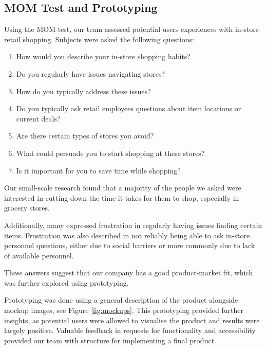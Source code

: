 \documentclass[titlepage]{article}
\begin{document}
\subsection{MOM Test and Prototyping}
Using the MOM test, our team assessed potential users experiences with in-store retail shopping. Subjects were asked the following questions:
\begin{enumerate}
    \item How would you describe your in-store shopping habits?
    \item Do you regularly have issues navigating stores?
    \item How do you typically address these issues?
    \item Do you typically ask retail employees questions about item locations or current deals?
    \item Are there certain types of stores you avoid?
    \item What could persuade you to start shopping at these stores?
    \item Is it important for you to save time while shopping?
\end{enumerate}
Our small-scale research found that a majority of the people we asked were interested in cutting down the time it takes for them to shop, especially in grocery stores. 

Additionally, many expressed frustration in regularly having issues finding certain items. Frustration was also described in not reliably being able to ask in-store personnel questions, either due to social barriers or more commonly due to lack of available personnel. 

These answers suggest that our company has a good product-market fit, which was further explored using prototyping.

Prototyping was done using a general description of the product alongside mockup images, see Figure \ref{fig:mockups}.
This prototyping provided further insights, as potential users were allowed to visualise the product and results were largely positive. Valuable feedback in requests for functionality and accessibility provided our team with structure for implementing a final product.
\end{document}
